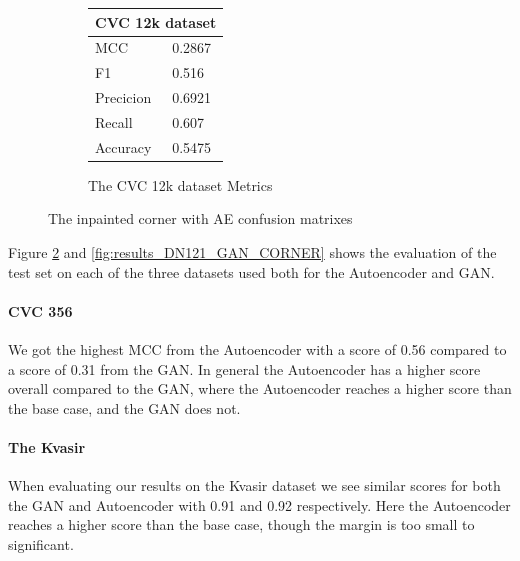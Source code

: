 \begin{figure}
\begin{subfigure}[b]{0.25\textwidth}
        \begin{tabular}{ll}
        \toprule
        \multicolumn{2}{c}{CVC 12k dataset}        \\
        \midrule
        MCC 		& 0.2867 \\
        F1  		& 0.516  \\
        Precicion  	& 0.6921 \\
        Recall     	& 0.607 \\
        Accuracy	& 0.5475 \\
        \bottomrule
        \end{tabular}
\caption{The CVC 12k dataset Metrics}
\label{tab:cvc12k_metrics_DN121_AE_CORNER}
\end{subfigure}
\caption{The inpainted corner with AE confusion matrixes}
\label{fig:results_DN121_AE_CORNER}
\end{figure}
\FloatBarrier

%
Figure \ref{fig:results_DN121_AE_CORNER} and \ref{fig:results_DN121_GAN_CORNER}  shows the evaluation of the test set on each of the three datasets used both for the Autoencoder and GAN. 

\paragraph{CVC 356}
We got the highest MCC from the Autoencoder with a score of 0.56 compared to a score of 0.31 from the GAN.
In general the Autoencoder has a higher score overall compared to the GAN, where the Autoencoder reaches a higher score than the base case, and the GAN does not.


\paragraph{The Kvasir}
When evaluating our results on the Kvasir dataset we see similar scores for both the GAN and Autoencoder with 0.91 and 0.92 respectively. Here the Autoencoder reaches a higher score than the base case, though the margin is too small to significant.

